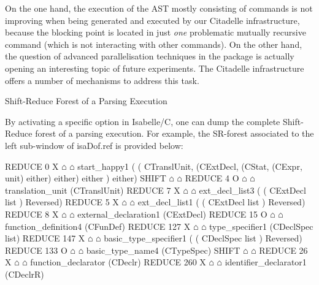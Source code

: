 \begin{isabellebody}
\begin{isamarkuptext}
 On the one hand, the execution of the AST mostly consisting of   commands
 is not improving when being generated and
executed by our Citadelle infrastructure, because the blocking point is located in just
\emph{one} problematic mutually recursive 
command (which is not interacting with other commands). 
On the other hand, the question of advanced parallelisation techniques in the  
package is actually opening an interesting topic of future experiments. 
The Citadelle infrastructure offers a number of mechanisms to address this task.%
\end{isamarkuptext}\isamarkuptrue%
%
\begin{isamarkupsubsection*}%
[label = {forest},type = {scholarly_paper.technical}, args={label = {forest},type = {scholarly_paper.technical}, Isa_COL.text_element.level = {}, Isa_COL.text_element.referentiable = {False}, Isa_COL.text_element.variants = {{STR ''outline'', STR ''document''}}, scholarly_paper.text_section.main_author = {}, scholarly_paper.text_section.fixme_list = {}, Isa_COL.text_element.level = {}, scholarly_paper.technical.definition_list = {}}]Shift-Reduce Forest of a Parsing Execution%
\end{isamarkupsubsection*}\isamarkuptrue%
%
\begin{isamarkuptext}%
By activating a specific option in Isabelle/C, one can dump the complete Shift-Reduce
forest of a parsing execution. For example, the SR-forest associated to the left sub-window of
\csname isaDof.ref is provided below:
\begin{isar}
REDUCE 0 X $\house$ $\house$ start_happy1  ( ( CTranslUnit, (CExtDecl, (CStat, (CExpr, unit) either) either) either )  either) 
 SHIFT $\house$ $\house$ 
 REDUCE 4 O $\house$ $\house$ translation_unit  (CTranslUnit) 
  REDUCE 7 X $\house$ $\house$ ext_decl_list3  ( ( CExtDecl list )  Reversed) 
   REDUCE 5 X $\house$ $\house$ ext_decl_list1  ( ( CExtDecl list )  Reversed) 
   REDUCE 8 X $\house$ $\house$ external_declaration1  (CExtDecl) 
    REDUCE 15 O $\house$ $\house$ function_definition4  (CFunDef) 
     REDUCE 127 X $\house$ $\house$ type_specifier1  (CDeclSpec list) 
      REDUCE 147 X $\house$ $\house$ basic_type_specifier1  ( ( CDeclSpec list )  Reversed) 
       REDUCE 133 O $\house$ $\house$ basic_type_name4  (CTypeSpec) 
        SHIFT $\house$ $\house$ 
     REDUCE 26 X $\house$ $\house$ function_declarator  (CDeclr) 
      REDUCE 260 X $\house$ $\house$ identifier_declarator1  (CDeclrR) 

\end{isar}
\end{isamarkuptext}
\end{isabellebody}
